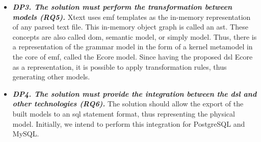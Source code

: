 \begin{itemize}
    \item\textit{\textbf{DP3. The solution must perform the transformation between models (RQ5).}}
    Xtext uses \ac{emf} templates as the in-memory representation of any parsed text file.
    This in-memory object graph is called an \ac{ast}.
    These concepts are also called \ac{dom}, semantic model, or simply model.
    Thus, there is a representation of the grammar model in the form of a kernel metamodel in the core of \ac{emf}, called the Ecore model.
    Since having the proposed \ac{dsl} Ecore as a representation, it is possible to apply transformation rules, thus generating other models.
    
    \item\textit{\textbf{DP4. The solution must provide the integration between the \ac{dsl} and other technologies (RQ6).}}
    The solution should allow the export of the built models to an \ac{sql} statement format, thus representing the physical model.
    Initially, we intend to perform this integration for PostgreSQL and MySQL.
    

\end{itemize}

